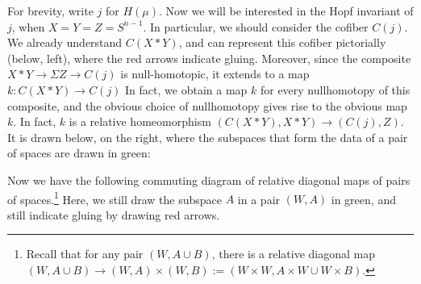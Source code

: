 \documentclass{article}
\newcommand{\Suspend}{\Sigma}
\renewcommand{\to}{\longrightarrow}
\theoremstyle{definition}
\newcommand{\HopfDiagram}[6]{
\ifthenelse{\equal{#1}{on}}
{\colorlet{LeftBar}{green}}
{\colorlet{LeftBar}{black}}
\ifthenelse{\equal{#2}{on}}
{\colorlet{BottomBar}{green}}
{\colorlet{BottomBar}{black}}
\ifthenelse{\equal{#1}{on}\OR \equal{#2}{on}}
{\colorlet{TheDot}{green}}
{\colorlet{TheDot}{black}}
\ifthenelse{\equal{#3}{BlackBeard}}
{\colorlet{GlueColor}{black}}
{\colorlet{GlueColor}{red}}
\ifthenelse{\equal{#3}{WhiteBeard}}
{\colorlet{GlueColor}{white}}
{}

\ifthenelse{\equal{#6}{cone}}
{\foreach \i in {0,...,9}
{\draw (#4+0,.1*\i+#5) -- (#4+1-.1*\i,1+#5);}
\foreach \i in {1,...,9}
{\draw (#4+.1*\i,0+#5) -- (#4+1,1-.1*\i+#5);}
\draw (#4+1,0+#5) -- (#4+1,1+#5);
\draw (#4+0,1+#5) -- (#4+1,1+#5);
}{}

\ifthenelse{\equal{#3}{WhiteBeard}}{}
{
\ifthenelse{\equal{#6}{nojoin}}{}
{
\ifthenelse{\equal{#6}{BottomBar}}{}
{\draw[ultra thick,LeftBar] (#4+0,0+#5) -- (#4+0,1+#5);}
\ifthenelse{\equal{#6}{LeftBar}}{}
{\draw[ultra thick,BottomBar] (#4+0,0+#5) -- (#4+1,0+#5)};
\fill[TheDot] (#4+0,0+#5) circle (3.42pt);
}
}

\ifthenelse{\equal{#3}{ArrowBeard}\OR \equal{#3}{BlackBeard}\OR \equal{#3}{WhiteBeard}}
{
\ifthenelse{\equal{#6}{BottomBar}}{}
{\draw[ultra thick,LeftBar] (#4+-.5,-.5+#5) -- (#4+-.5,1+#5);}
\ifthenelse{\equal{#6}{LeftBar}}{}
{\draw[ultra thick,BottomBar] (#4+-.5,-.5+#5) -- (#4+1,-.5+#5);}
\fill[TheDot] (#4+-.5,-.5+#5) circle (3.4pt);
\foreach \i in {0,2,4,6,8,10}
{\draw[->,GlueColor] (#4+-.1+.11*\i,-.1+#5) -- (#4+-.4+.14*\i,-.4+#5);}
\foreach \i in {2,4,6,8,10}
{\draw[->,GlueColor] (#4+-.1,-.1+.11*\i+#5) -- (#4+-.4,-.4+.14*\i+#5);}
}{}%
}
\begin{document}
For brevity, write $j$ for $H(\mu)$. Now we will be interested in the Hopf invariant of $j$, when $X=Y=Z=S^{n-1}$. In particular, we should consider the cofiber $C(j)$. We already understand $C(X\ast Y)$, and can represent this cofiber pictorially (below, left), where the red arrows indicate gluing. Moreover, since the composite $X \ast Y \to \Suspend Z \to C(j)$ is null-homotopic, it extends to a  map $k:C(X\ast Y)\to C(j)$
In fact, we obtain a map $k$ for every nullhomotopy of this composite, and the obvious choice of nullhomotopy gives rise to the obvious map $k$.
In fact, $k$ is a relative homeomorphism $(C(X\ast Y),X\ast Y)\to (C(j),Z)$. It is drawn below, on the right, where the subspaces that form the data of a pair of spaces are drawn in green:
\begin{center}
\end{center}
%
%
Now we have the following commuting diagram of relative diagonal maps of pairs of spaces.\footnote{Recall that for any pair $(W,A\cup B)$, there is a relative diagonal map $(W,A\cup B)\to (W,A)\times (W,B):=(W\times W,A\times W\cup W\times B)$.} Here, we still draw the subspace $A$ in a pair $(W,A)$ in green, and still indicate gluing by drawing red arrows. 
\end{document}

